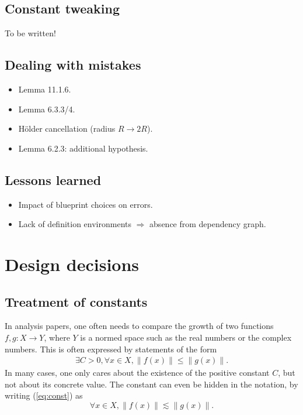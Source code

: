 \documentclass[12pt]{amsart}
\begin{document}
\subsection{Constant tweaking} To be written!

\subsection{Dealing with mistakes}\label{subsec:blueprint_mistakes}
\begin{itemize}
  \item Lemma 11.1.6.
  \item Lemma 6.3.3/4.
  \item Hölder cancellation (radius $R \to 2R$).
  \item Lemma 6.2.3: additional hypothesis.
\end{itemize}

\subsection{Lessons learned}\label{subsec:blueprint_lessons}
\begin{itemize}
	\item Impact of blueprint choices on errors.
	\item Lack of definition environments $\Rightarrow$ absence from dependency graph.
\end{itemize}

\section{Design decisions}\label{sec:design}
\subsection{Treatment of constants}\label{subsec:constants}
In analysis papers, one often needs to compare the growth of two functions $f, g : X \to Y$, where $Y$ is a normed space such as the real numbers or the complex numbers. This is often expressed by statements of the form
\begin{align}\label{eq:const}
	\exists C > 0, \forall x \in X, \| f (x) \| \le \|g(x)\|.
\end{align}
In many cases, one only cares about the existence of the positive constant $C$, but not about its concrete value. The constant can even be hidden in the notation, by writing (\ref{eq:const}) as
\[ \forall x \in X, \| f (x) \| \lesssim \|g(x)\|.\]
\end{document}
